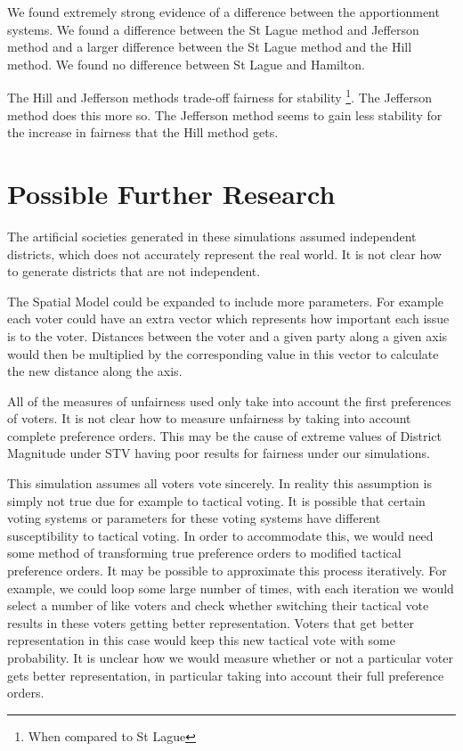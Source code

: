 \documentclass{article}
\begin{document}
We found extremely strong evidence of a difference between the apportionment systems. We found a difference between the St Lague method and Jefferson method and a larger difference between the St Lague method and the Hill method. We found no difference between St Lague and Hamilton.

The Hill and Jefferson methods trade-off fairness for stability \footnote{When compared to St Lague}. The Jefferson method does this more so. The Jefferson method seems to gain less stability for the increase in fairness that the Hill method gets.

\section{Possible Further Research}

The artificial societies generated in these simulations assumed independent districts, which does not accurately represent the real world. It is not clear how to generate districts that are not independent.

The Spatial Model could be expanded to include more parameters. For example each voter could have an extra vector which represents how important each issue is to the voter. Distances between the voter and a given party along a given axis would then be multiplied by the corresponding value in this vector to calculate the new distance along the axis.

All of the measures of unfairness used only take into account the first preferences of voters. It is not clear how to measure unfairness by taking into account complete preference orders. This may be the cause of extreme values of District Magnitude under STV having poor results for fairness under our simulations.

This simulation assumes all voters vote sincerely. In reality this assumption is simply not true due for example to tactical voting. It is possible that certain voting systems or parameters for these voting systems have different susceptibility to tactical voting. In order to accommodate this, we would need some method of transforming true preference orders to modified tactical preference orders. It may be possible to approximate this process iteratively. For example, we could loop some large number of times, with each iteration we would select a number of like voters and check whether switching their tactical vote results in these voters getting better representation. Voters that get better representation in this case would keep this new tactical vote with some probability. It is unclear how we would measure whether or not a particular voter gets better representation, in particular taking into account their full preference orders.
\end{document}
